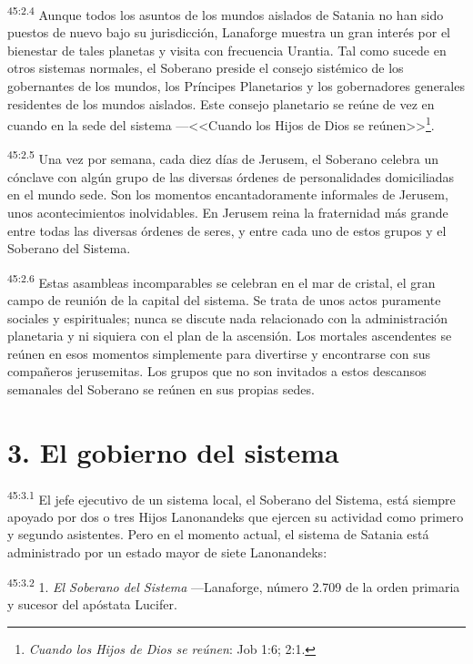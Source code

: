 \par
\textsuperscript{45:2.4} Aunque todos los asuntos de los mundos aislados de Satania no han sido puestos de nuevo bajo su jurisdicción, Lanaforge muestra un gran interés por el bienestar de tales planetas y visita con frecuencia Urantia. Tal como sucede en otros sistemas normales, el Soberano preside el consejo sistémico de los gobernantes de los mundos, los Príncipes Planetarios y los gobernadores generales residentes de los mundos aislados. Este consejo planetario se reúne de vez en cuando en la sede del sistema ---<<Cuando los Hijos de Dios se reúnen>>\footnote{\textit{Cuando los Hijos de Dios se reúnen}: Job 1:6; 2:1.}.

\par
\textsuperscript{45:2.5} Una vez por semana, cada diez días de Jerusem, el Soberano celebra un cónclave con algún grupo de las diversas órdenes de personalidades domiciliadas en el mundo sede. Son los momentos encantadoramente informales de Jerusem, unos acontecimientos inolvidables. En Jerusem reina la fraternidad más grande entre todas las diversas órdenes de seres, y entre cada uno de estos grupos y el Soberano del Sistema.

\par
\textsuperscript{45:2.6} Estas asambleas incomparables se celebran en el mar de cristal, el gran campo de reunión de la capital del sistema. Se trata de unos actos puramente sociales y espirituales; nunca se discute nada relacionado con la administración planetaria y ni siquiera con el plan de la ascensión. Los mortales ascendentes se reúnen en esos momentos simplemente para divertirse y encontrarse con sus compañeros jerusemitas. Los grupos que no son invitados a estos descansos semanales del Soberano se reúnen en sus propias sedes.

\section*{3. El gobierno del sistema}
\par
\textsuperscript{45:3.1} El jefe ejecutivo de un sistema local, el Soberano del Sistema, está siempre apoyado por dos o tres Hijos Lanonandeks que ejercen su actividad como primero y segundo asistentes. Pero en el momento actual, el sistema de Satania está administrado por un estado mayor de siete Lanonandeks:

\par
\textsuperscript{45:3.2} 1. \textit{El Soberano del Sistema} ---Lanaforge, número 2.709 de la orden primaria y sucesor del apóstata Lucifer.

